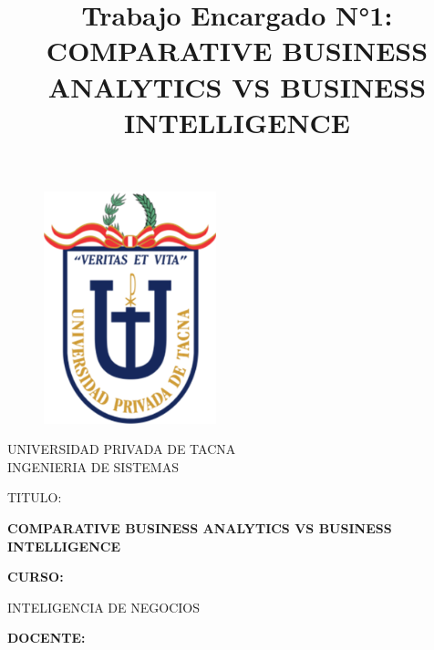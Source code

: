 \documentclass{article}
\begin{document}
\title{Trabajo Encargado N°1: COMPARATIVE BUSINESS ANALYTICS VS BUSINESS INTELLIGENCE}
\begin{titlepage}
\begin{figure}[htb]
\begin{center}
\includegraphics[width=5cm]{logo.png}
\end{center}
\end{figure}
\vspace*{-0.25in}
\begin{center}
\large{UNIVERSIDAD PRIVADA DE TACNA}\\
\vspace*{-0.025in}
INGENIERIA DE SISTEMAS  \\

\vspace*{0.5in}
\begin{large}
TITULO:\\
\end{large}

\vspace*{0.1in}
\begin{Large}
\textbf{COMPARATIVE BUSINESS ANALYTICS VS BUSINESS INTELLIGENCE} \\
\end{Large}

\vspace*{0.3in}
\begin{Large}
\textbf{CURSO:} \\
\end{Large}

\vspace*{0.1in}
\begin{large}
INTELIGENCIA DE NEGOCIOS\\
\end{large}

\vspace*{0.3in}
\begin{Large}
\textbf{DOCENTE:} \\
\end{Large}


\end{center}
\end{titlepage}
\end{document}
